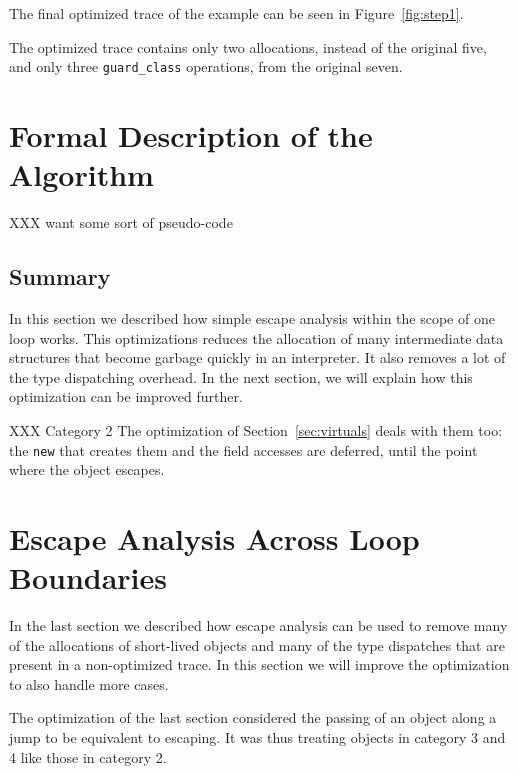 \documentclass{sigplanconf}
\begin{document}
The final optimized trace of the example can be seen in
Figure~\ref{fig:step1}.

The optimized trace contains only two allocations, instead of the original five,
and only three \texttt{guard\_class} operations, from the original seven.

\section{Formal Description of the Algorithm}
\label{sec:Algorithm}

XXX want some sort of pseudo-code



\subsection{Summary}

In this section we described how simple escape analysis within the scope of one
loop works. This optimizations reduces the allocation of many intermediate data
structures that become garbage quickly in an interpreter. It also removes a lot
of the type dispatching overhead. In the next section, we will explain how this
optimization can be improved further.

XXX Category 2 The optimization of
Section~\ref{sec:virtuals} deals with them too: the \texttt{new} that creates them and
the field accesses are deferred, until the point where the object escapes.


\section{Escape Analysis Across Loop Boundaries}
\label{sec:crossloop}

In the last section we described how escape analysis can be used to remove
many of the allocations of short-lived objects and many of the type dispatches
that are present in a non-optimized trace. In this section we will improve the
optimization to also handle more cases.

The optimization of the last section considered the passing of an object along a
jump to be equivalent to escaping. It was thus treating objects in category 3
and 4 like those in category 2.
\end{document}
